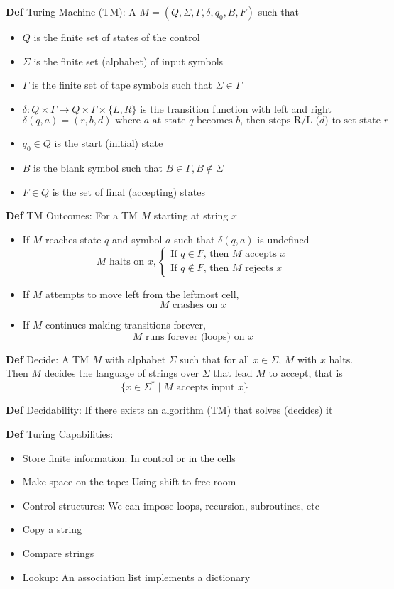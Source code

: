\documentclass[11pt,notitlepage]{report}
\newcommand{\tbf}[1]{\textbf{#1}}
\begin{document}
\tbf{Def} Turing Machine (TM): A $M = (Q, \Sigma, \Gamma, \delta, q_0, B, F)$ such that
\vspace{-2mm}
\begin{itemize}
    \item $Q$ is the finite set of states of the control
    \item $\Sigma$ is the finite set (alphabet) of input symbols
    \item $\Gamma$ is the finite set of tape symbols such that $\Sigma \in \Gamma$
    \item $\delta: Q \times \Gamma \to Q \times \Gamma \times \{L, R\}$ is the transition function with left and right
    $$\delta(q,a) = (r,b,d) \text{ where $a$ at state $q$ becomes $b$, then steps R/L ($d$) to set state $r$}$$
    \item $q_0 \in Q$ is the start (initial) state
    \item $B$ is the blank symbol such that $B \in \Gamma, B \not \in \Sigma$
    \item $F \in Q$ is the set of final (accepting) states
\end{itemize}

\tbf{Def} TM Outcomes: For a TM $M$ starting at string $x$
\vspace{-2mm}
\begin{itemize}
    \item If $M$ reaches state $q$ and symbol $a$ such that $\delta(q, a)$ is undefined
    $$M \text{ halts on }x, \begin{cases}\text{If $q \in F$, then $M$ accepts $x$}\\\text{If $q \not \in F$, then $M$ rejects $x$}\end{cases}$$
    \item If $M$ attempts to move left from the leftmost cell,
    $$M \text{ crashes on }x$$
    \item If $M$ continues making transitions forever,
    $$M \text{ runs forever (loops) on }x$$
\end{itemize}

\tbf{Def} Decide: A TM $M$ with alphabet $\Sigma$ such that for all $x \in \Sigma$, $M$ with $x$ halts. Then $M$ decides the language of strings over $\Sigma$ that lead $M$ to accept, that is
$$\{x \in \Sigma^* \mid M \text{ accepts input } x\}$$

\tbf{Def} Decidability: If there exists an algorithm (TM) that solves (decides) it

\tbf{Def} Turing Capabilities:
\begin{itemize}
    \item Store finite information: In control or in the cells
    \item Make space on the tape: Using shift to free room
    \item Control structures: We can impose loops, recursion, subroutines, etc
    \item Copy a string
    \item Compare strings
    \item Lookup: An association list implements a dictionary
\end{itemize}
\end{document}
